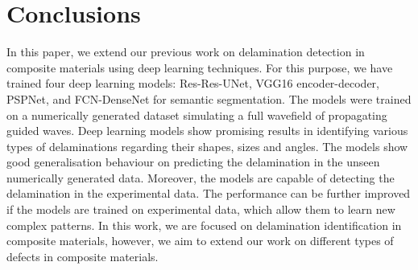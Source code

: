 \section{Conclusions}
\label{conclusion}
In this paper, we extend our previous work on delamination detection in composite materials using deep learning techniques. 
For this purpose, we have trained four deep learning models: Res-Res-UNet, VGG16 encoder-decoder, PSPNet, and  FCN-DenseNet for semantic segmentation.
The models were trained on a numerically generated dataset simulating a  full wavefield of propagating guided waves.
Deep learning models show promising results in identifying various types of delaminations regarding their shapes, sizes and angles. 
The models show good generalisation behaviour on predicting the delamination in the unseen numerically generated data.
Moreover, the models are capable of detecting the delamination in the experimental data.
The performance can be further improved if the models are trained on experimental data, which allow them to learn new complex patterns.
In this work, we are focused on delamination identification in composite materials, however, we aim to extend our work on different types of defects in composite materials.

